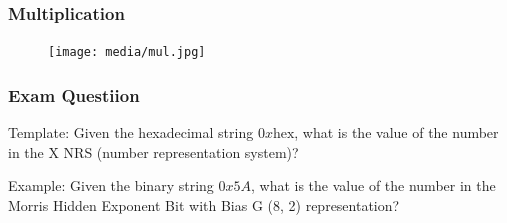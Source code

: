 \begin{frame}
    \frametitle{Multiplication}
    \begin{figure}[tp]
    \texttt{[image: media/mul.jpg]}
    \end{figure}
\end{frame}

\begin{frame}
    \frametitle{Exam Questiion}
    Template: Given the hexadecimal string $0x\text{hex}$, what is the value of the number in the X NRS (number representation system)?
    
    Example: Given the binary string $0x5A$, what is the value of the number in the Morris Hidden Exponent Bit with Bias G (8, 2) representation?
\end{frame}
